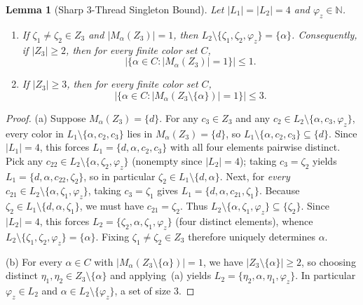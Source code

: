 \documentclass[11pt,a4paper]{article}
\newtheorem{lemma}[theorem]{Lemma}
\theoremstyle{definition}
\newcommand{\N}{\mathbb{N}}
\begin{document}
\begin{lemma}[Sharp $3$-Thread Singleton Bound]\label{lem:3thread-singleton}
Let $|L_1| = |L_2| = 4$ and $\varphi_z \in \N$.
\begin{enumerate}[label=(\alph*),leftmargin=*,itemsep=2pt]
  \item If $\zeta_1 \neq \zeta_2 \in Z_3$ and $|M_\alpha(Z_3)| = 1$, then $L_2 \setminus \{\zeta_1, \zeta_2, \varphi_z\} = \{\alpha\}$. Consequently, if $|Z_3| \ge 2$, then for every finite color set $C$,
  \[
    \bigl|\{\alpha \in C : |M_\alpha(Z_3)| = 1\}\bigr| \le 1.
  \]
  \item If $|Z_3| \ge 3$, then for every finite color set $C$,
  \[
    \bigl|\{\alpha \in C : |M_\alpha(Z_3 \setminus \{\alpha\})| = 1\}\bigr| \le 3.
  \]
\end{enumerate}
\end{lemma}

\begin{proof}
(a) Suppose $M_\alpha(Z_3) = \{d\}$. For any $c_3 \in Z_3$ and any $c_2 \in L_2 \setminus \{\alpha, c_3, \varphi_z\}$, every color in $L_1 \setminus \{\alpha, c_2, c_3\}$ lies in $M_\alpha(Z_3) = \{d\}$, so $L_1 \setminus \{\alpha, c_2, c_3\} \subseteq \{d\}$. Since $|L_1| = 4$, this forces $L_1 = \{d, \alpha, c_2, c_3\}$ with all four elements pairwise distinct.
Pick any $c_{22} \in L_2 \setminus \{\alpha, \zeta_2, \varphi_z\}$ (nonempty since $|L_2| = 4$); taking $c_3 = \zeta_2$ yields $L_1 = \{d, \alpha, c_{22}, \zeta_2\}$, so in particular $\zeta_2 \in L_1 \setminus \{d, \alpha\}$. Next, for \emph{every} $c_{21} \in L_2 \setminus \{\alpha, \zeta_1, \varphi_z\}$, taking $c_3 = \zeta_1$ gives $L_1 = \{d, \alpha, c_{21}, \zeta_1\}$. Because $\zeta_2 \in L_1 \setminus \{d, \alpha, \zeta_1\}$, we must have $c_{21} = \zeta_2$. Thus $L_2 \setminus \{\alpha, \zeta_1, \varphi_z\} \subseteq \{\zeta_2\}$. Since $|L_2| = 4$, this forces $L_2 = \{\zeta_2, \alpha, \zeta_1, \varphi_z\}$ (four distinct elements), whence $L_2 \setminus \{\zeta_1, \zeta_2, \varphi_z\} = \{\alpha\}$. Fixing $\zeta_1 \neq \zeta_2 \in Z_3$ therefore uniquely determines $\alpha$.

(b) For every $\alpha \in C$ with $|M_\alpha(Z_3 \setminus \{\alpha\})| = 1$, we have $|Z_3 \setminus \{\alpha\}| \ge 2$, so choosing distinct $\eta_1, \eta_2 \in Z_3 \setminus \{\alpha\}$ and applying~(a) yields $L_2 = \{\eta_2, \alpha, \eta_1, \varphi_z\}$. In particular $\varphi_z \in L_2$ and $\alpha \in L_2 \setminus \{\varphi_z\}$, a set of size $3$.
\end{proof}
\end{document}
